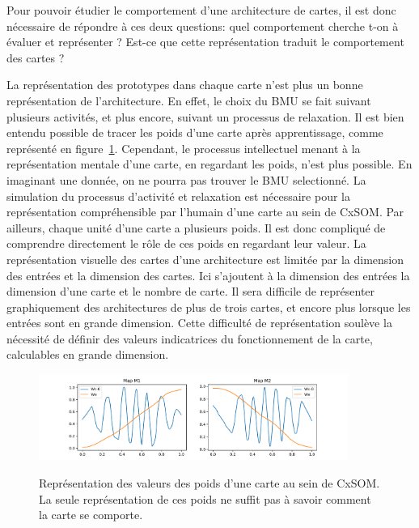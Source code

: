 Pour pouvoir étudier le comportement d'une architecture de cartes, il est donc nécessaire de répondre à ces deux questions: quel comportement cherche t-on à évaluer et représenter ? Est-ce que cette représentation traduit le comportement des cartes ?

La représentation des prototypes dans chaque carte n'est plus un bonne représentation de l'architecture.
En effet, le choix du BMU se fait suivant plusieurs activités, et plus encore, suivant un processus de relaxation. Il est bien entendu possible de tracer les poids d'une carte après apprentissage, comme représenté en figure~\ref{fig:weights}. Cependant, le processus intellectuel menant à la représentation mentale d'une carte, en regardant les poids, n'est plus possible. En imaginant une donnée, on ne pourra pas trouver le BMU selectionné. La simulation du processus d'activité et relaxation est nécessaire pour la représentation compréhensible par l'humain d'une carte au sein de CxSOM. Par ailleurs, chaque unité d'une carte a plusieurs poids. Il est donc compliqué de comprendre directement le rôle de ces poids en regardant leur valeur. La représentation visuelle des cartes d'une architecture est limitée par la dimension des entrées et la dimension des cartes. Ici s'ajoutent à la dimension des entrées la dimension d'une carte et le nombre de carte. Il sera difficile de représenter graphiquement des architectures de plus de trois cartes, et encore plus lorsque les entrées sont en grande dimension. Cette difficulté de représentation soulève la nécessité de définir des valeurs indicatrices du fonctionnement de la carte, calculables en grande dimension.

\begin{figure}
\centering
\includegraphics[width=0.9\textwidth]{weights_cercle1.pdf}
\label{fig:weights}
\caption{Représentation des valeurs des poids d'une carte au sein de CxSOM. La seule représentation de ces poids ne suffit pas à savoir comment la carte se comporte.}
\end{figure}


